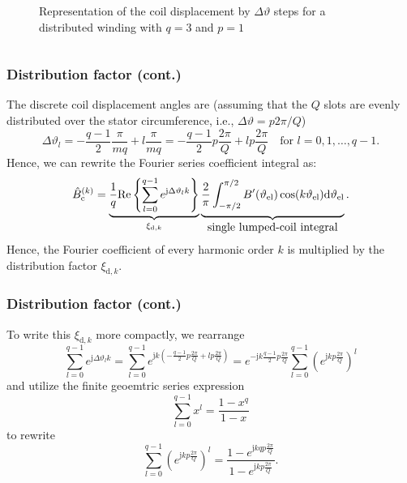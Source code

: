 \begin{frame}
\begin{columns}
\begin{column}{0.4\textwidth}
\begin{figure}
                \caption{Representation of the coil displacement by $\Delta \vartheta$ steps for a distributed winding with $q=3$ and $p=1$}
                \label{fig:MMF_single_phase_distributed}
            \end{figure}
        \end{column}
    \end{columns}
\end{frame}

\begin{frame}
	\frametitle{Distribution factor  (cont.)}
   The discrete coil displacement angles are (assuming that the $Q$ slots are evenly distributed over the stator circumference, i.e., $\Delta \vartheta = p 2  \pi/Q$)
   \begin{equation}
    \Delta\vartheta_l = -\frac{q-1}{2} \frac{\pi}{m q} + l \frac{\pi}{m q} = -\frac{q-1}{2} p \frac{2\pi}{Q} + l p \frac{2\pi}{Q} \quad \mbox{for } l=0,1,\ldots,q-1.
   \end{equation}
   Hence, we can rewrite the Fourier series coefficient integral as:
   \begin{equation}
    \hat{B}_{\mathrm{c}}^{(k)} = \underbrace{\frac{1}{q}\mathrm{Re}\left\{\sum_{l=0}^{q-1} e^{\mathrm{j} \Delta\vartheta_l k}\right\} }_{\xi_{\mathrm{d},k}} \underbrace{\frac{2}{\pi}\int_{-\pi/2}^{\pi/2} B'(\vartheta_\mathrm{el}) \cos(k \vartheta_\mathrm{el}) \mathrm{d}\vartheta_\mathrm{el} \vphantom{\sum_{l=0}^{q-1}}}_{\mbox{single lumped-coil integral}}.
    \label{eq:B_single_phase_coil_fourier_series_coefficients_distributed}
\end{equation}
Hence, the Fourier coefficient of every harmonic order $k$ is multiplied by the distribution factor $\xi_{\mathrm{d},k}$. 
\end{frame}

\begin{frame}
	\frametitle{Distribution factor  (cont.)}
    To write this $\xi_{\mathrm{d},k}$ more compactly, we rearrange 
    \begin{equation}
        \sum_{l=0}^{q-1} e^{\mathrm{j} \Delta\vartheta_l k} = \sum_{l=0}^{q-1} e^{\mathrm{j} k (-\frac{q-1}{2} p \frac{2\pi}{Q} + l p \frac{2\pi}{Q})} = e^{- \mathrm{j} k \frac{q-1}{2} p \frac{2\pi}{Q}} \sum_{l=0}^{q-1} \left(e^{\mathrm{j} k  p \frac{2\pi}{Q}}\right)^l
        \label{eq:sum_exp_distribution_factor}
    \end{equation}
    and utilize the finite geoemtric series expression
    $$
    \sum_{l=0}^{q-1} x^l = \frac{1-x^q}{1-x}
    $$
    to rewrite
    $$
    \sum_{l=0}^{q-1} \left(e^{\mathrm{j} k  p \frac{2\pi}{Q}}\right)^l = \frac{1-e^{\mathrm{j} k q p \frac{2\pi}{Q}}}{1-e^{\mathrm{j} k  p \frac{2\pi}{Q}}}.
    $$
\end{frame}

